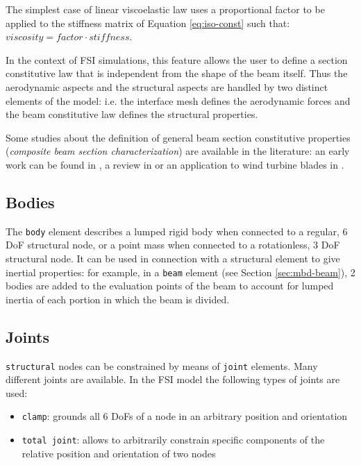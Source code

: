 The simplest case of linear viscoelastic law uses a proportional factor to be applied to the stiffness matrix of Equation \ref{eq:iso-const} such that: $viscosity=factor \cdot stiffness$.






In the context of FSI simulations, this feature allows the user to define a section constitutive law that is independent from the shape of the beam itself. Thus the aerodynamic aspects and the structural aspects are handled by two distinct elements of the model: i.e. the interface mesh defines the aerodynamic forces and the beam constitutive law defines the structural properties.   

Some studies about the definition of general beam section constitutive properties (\textit{composite beam section characterization}) are available in the literature: an early work can be found in \cite{giavotto1983anisotropic}, a review in \cite{hodges1990review} or an application to wind turbine blades in \cite{kim2013development}.


\subsection{Bodies}
\label{sec:mbd-body}

The \texttt{body} element describes a lumped rigid body when connected to a regular, 6 DoF structural node, or a point mass when connected to a rotationless, 3 DoF structural node. It can be used in connection with a structural element to give inertial properties: for example, in a \texttt{beam} element (see Section \ref{sec:mbd-beam}), 2 bodies are added to the evaluation points of the beam to account for lumped inertia of each portion in which the beam is divided. 


\subsection{Joints}
\label{sec:mbd-joint}

\texttt{structural} nodes can be constrained by means of \texttt{joint} elements. Many different joints are available. In the FSI model the following types of joints are used:

\begin{itemize}
	\item \texttt{clamp}: grounds all 6 DoFs of a node in an arbitrary position and orientation
	\item \texttt{total joint}: allows to arbitrarily constrain specific components of the relative position and orientation of two nodes\cite{masarati2013formulation}
\end{itemize}


